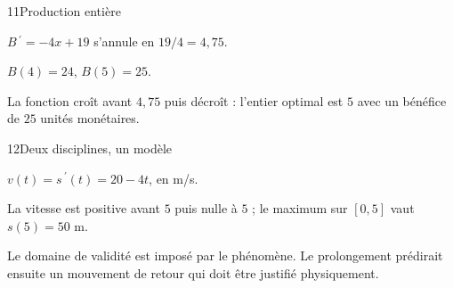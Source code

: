 \begin{corrige}{11}{Production entière}
\begin{questions}
\item $B\,\!^{\prime}=-4x+19$ s’annule en $19/4=4{,}75$.
\item $B(4)=24$, $B(5)=25$.
\item La fonction croît avant $4{,}75$ puis décroît : l’entier optimal est $5$ avec un bénéfice de $25$ unités monétaires.
\end{questions}
\end{corrige}
\begin{corrige}{12}{Deux disciplines, un modèle}
\begin{questions}
\item $v(t)=s\,\!^{\prime}(t)=20-4t$, en m/s.
\item La vitesse est positive avant $5$ puis nulle à $5$ ; le maximum sur $[0,5]$ vaut $s(5)=50$ m.
\item Le domaine de validité est imposé par le phénomène. Le prolongement prédirait ensuite un mouvement de retour qui doit être justifié physiquement.
\end{questions}
\end{corrige}
